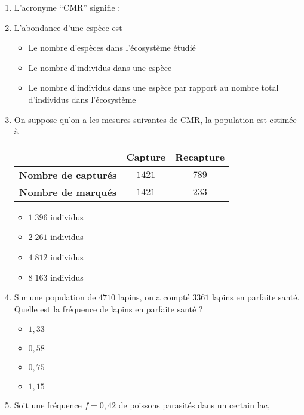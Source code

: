 \documentclass[11pt]{article}
\begin{document}
\begin{enumerate}
  \item L'acronyme ``CMR'' signifie :
  \item L'abondance d'une espèce est
    \begin{itemize}[label=$\Box$]
      \item Le nombre d'espèces dans l'écosystème étudié
      \item Le nombre d'individus dans une espèce
      \item {\small Le nombre d'individus dans une espèce par rapport au nombre total
        d'individus dans l'écosystème}
    \end{itemize}
  \item On suppose qu'on a les mesures suivantes de CMR, la population est
    estimée à
\begin{center}
\begin{tabular}{ccc}
  \toprule
  & \textbf{Capture} & \textbf{Recapture} \\ \midrule
  \textbf{Nombre de capturés} & $1421$ & $789$ \\
  \textbf{Nombre de marqués} & $1421$ & $233$ \\ \bottomrule
 \end{tabular}
\end{center}
\begin{multicols}{2}
\begin{itemize}[label=$\Box$]
  \item $1\;396$ individus
  \item $2\;261$ individus
  \item $4\;812$ individus
  \item $8\;163$ individus
\end{itemize}
\end{multicols}
\item Sur une population de $4710$ lapins, on a compté $3361$ lapins en parfaite
  santé. Quelle est la fréquence de lapins en parfaite santé ?
  \begin{multicols}{4}
  \begin{itemize}[label=$\Box$]
    \item $1,33$
    \item $0,58$
    \item $0,75$
    \item $1,15$
  \end{itemize}
  \end{multicols}
\item Soit une fréquence $f=0,42$ de poissons parasités dans un certain lac,

\end{enumerate}
\end{document}
